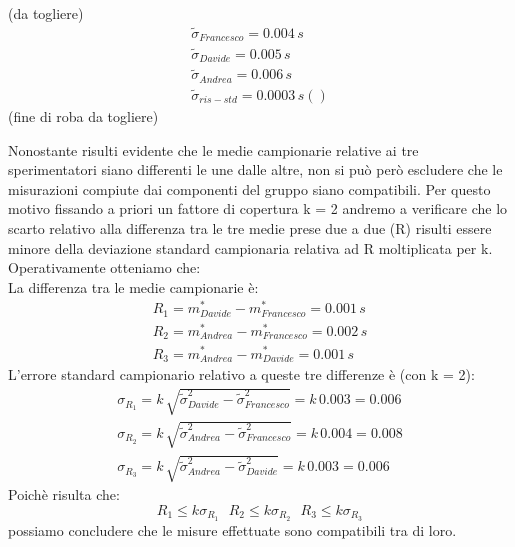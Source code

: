 (da togliere)
\begin{equation*}
	\begin{split}
		\tilde{\sigma}_{Francesco} = 0.004\,s \\
		\tilde{\sigma}_{Davide} = 0.005\,s \\
		\tilde{\sigma}_{Andrea} = 0.006\,s \\
		\tilde{\sigma}_{ris-std} = 0.0003\,s ()
	\end{split}
\end{equation*} (fine di roba da togliere)




Nonostante risulti evidente che le medie campionarie relative ai tre
sperimentatori siano differenti le une dalle altre, non si può però
escludere che le misurazioni compiute dai componenti del gruppo siano
compatibili. Per questo motivo fissando a priori un fattore di copertura
k = 2 andremo a verificare che lo scarto relativo alla differenza tra le
tre medie prese due a due (R) risulti essere minore della deviazione
standard campionaria relativa ad R moltiplicata per k. Operativamente
otteniamo che:\\
La differenza tra le medie campionarie è:
\begin{equation}
\begin{split}
	R_{1} = m_{Davide}^* - m_{Francesco}^* = 0.001\,s \\
	R_{2} = m_{Andrea}^* - m_{Francesco}^* = 0.002\,s \\
	R_{3} = m_{Andrea}^* - m_{Davide}^* = 0.001\,s
\end{split}
\end{equation}
L'errore standard campionario relativo a queste tre differenze è (con k = 2):
\begin{equation}
\begin{split}
	\sigma_{R_{1}} = k\,\sqrt{\tilde{\sigma}^2_{Davide} - \tilde{\sigma}^2_{Francesco}} = k\,0.003 = 0.006\\
	\sigma_{R_{2}} = k\,\sqrt{\tilde{\sigma}^2_{Andrea} - \tilde{\sigma}^2_{Francesco}} = k\,0.004 = 0.008\\
	\sigma_{R_{3}} = k\,\sqrt{\tilde{\sigma}^2_{Andrea} - \tilde{\sigma}^2_{Davide}} = k\,0.003 = 0.006
\end{split}
\end{equation}
Poichè risulta che:
\begin{equation}
	R_{1}\leq{k\sigma_{R_{1}}}\,\,\,\,R_{2}\leq{k\sigma_{R_{2}}}\,\,\,\,R_{3}\leq{k\sigma_{R_{3}}}
\end{equation}
possiamo concludere che le misure effettuate sono compatibili tra di loro.\\
 
